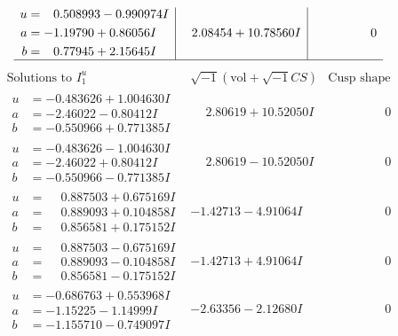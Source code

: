 \documentclass[1p]{elsarticle_modified}
\theoremstyle{definition}
\newcommand{\I}{\sqrt{-1}}
\begin{document}
$$\begin{array}{c|c|c}
\begin{aligned}
u &= \phantom{-}0.508993 - 0.990974 I \\
a &= -1.19790 + 0.86056 I \\
b &= \phantom{-}0.77945 + 2.15645 I\end{aligned}
 & \phantom{-}2.08454 + 10.78560 I & \phantom{-0.000000 } 0\\
 \hline 
 \end{array}$$\newpage$$\begin{array}{c|c|c}  
\text{Solutions to }I^u_{1}& \I (\text{vol} + \sqrt{-1}CS) & \text{Cusp shape}\\
 \hline 
\begin{aligned}
u &= -0.483626 + 1.004630 I \\
a &= -2.46022 - 0.80412 I \\
b &= -0.550966 + 0.771385 I\end{aligned}
 & \phantom{-}2.80619 + 10.52050 I & \phantom{-0.000000 } 0 \\ \hline\begin{aligned}
u &= -0.483626 - 1.004630 I \\
a &= -2.46022 + 0.80412 I \\
b &= -0.550966 - 0.771385 I\end{aligned}
 & \phantom{-}2.80619 - 10.52050 I & \phantom{-0.000000 } 0 \\ \hline\begin{aligned}
u &= \phantom{-}0.887503 + 0.675169 I \\
a &= \phantom{-}0.889093 + 0.104858 I \\
b &= \phantom{-}0.856581 + 0.175152 I\end{aligned}
 & -1.42713 - 4.91064 I & \phantom{-0.000000 } 0 \\ \hline\begin{aligned}
u &= \phantom{-}0.887503 - 0.675169 I \\
a &= \phantom{-}0.889093 - 0.104858 I \\
b &= \phantom{-}0.856581 - 0.175152 I\end{aligned}
 & -1.42713 + 4.91064 I & \phantom{-0.000000 } 0 \\ \hline\begin{aligned}
u &= -0.686763 + 0.553968 I \\
a &= -1.15225 - 1.14999 I \\
b &= -1.155710 - 0.749097 I\end{aligned}
 & -2.63356 - 2.12680 I & \phantom{-0.000000 } 0 \\ \hline\begin{aligned}

\end{aligned}
\end{array}$$
\end{document}
